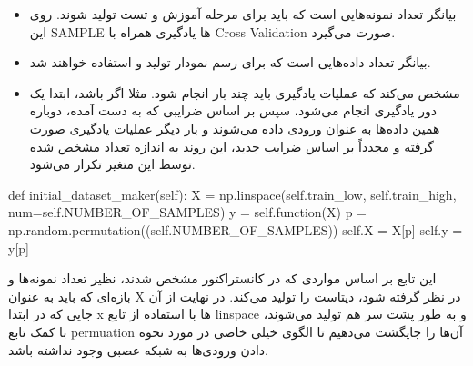 \documentclass[12pt,titlepage,a4page , tikz , multi,table , svgnames,xcdraw]{article}
\begin{document}
\begin{itemize}
\item
{}
بیانگر تعداد نمونه‌هایی است که باید برای مرحله آموزش و تست تولید شوند. روی این SAMPLE ها یادگیری همراه با Cross Validation صورت می‌گیرد.



\item
{}
بیانگر تعداد داده‌هایی است که برای رسم نمودار تولید و استفاده خواهند شد.


\item
{}
مشخص می‌کند که عملیات یادگیری باید چند بار انجام شود. مثلا اگر  باشد، ابتدا یک دور یادگیری انجام می‌شود، سپس بر اساس ضرایبی که به دست آمده، دوباره همین داده‌ها به عنوان ورودی داده می‌شوند و بار دیگر عملیات یادگیری صورت گرفته و مجدداً بر اساس ضرایب جدید، این روند به اندازه تعداد مشخص شده توسط این متغیر تکرار می‌شود.




\end{itemize}

\newpage


\begin{latin}
\begin{python}[language=Python]
def initial_dataset_maker(self):
        X = np.linspace(self.train_low, self.train_high,
         num=self.NUMBER_OF_SAMPLES)
        y = self.function(X)
        p = np.random.permutation((self.NUMBER_OF_SAMPLES))
        self.X = X[p]
        self.y = y[p]
\end{python}

\end{latin}

این تابع بر اساس مواردی که در کانستراکتور مشخص شدند، نظیر تعداد نمونه‌ها و بازه‌ای که باید به عنوان X در نظر گرفته شود، دیتاست را تولید می‌کند. در نهایت از آن جایی که در ابتدا x ها با استفاده از تابع linspace و به طور پشت سر هم تولید می‌شوند، با کمک تابع permuation آن‌ها را جایگشت می‌دهیم تا الگوی خیلی خاصی در مورد نحوه دادن ورودی‌ها به شبکه عصبی وجود نداشته باشد.
\end{document}
